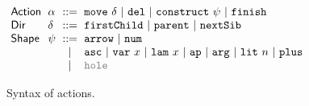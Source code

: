 \begin{figure}[t]
\hspace{-3px}$\arraycolsep=3pt\begin{array}{llcllll}
\mathsf{Action} & \alpha & ::= &
  \aMove{\delta} ~\vert~
  \aDel ~\vert~
  \aConstruct{\psi} ~\vert~
  \aFinish\\
\mathsf{Dir} & \delta & ::= &
  \dChild ~\vert~
  \dParent ~\vert~
  \dNext \\ %
\mathsf{Shape} & \psi & ::= &
  \farr ~\vert~
  \fnum \\
& & \vert &
  \fasc ~\vert~
  \fvar{x} ~\vert~
  \flam{x} ~\vert~
  \fap ~\vert~
  \farg ~\vert~
  \fnumlit{n} ~\vert~
  \fplus\\
& & \vert & 
  {\color{gray}\fnehole}
\end{array}$
\caption{Syntax of actions.}
\label{fig:action-syntax}
\end{figure}

